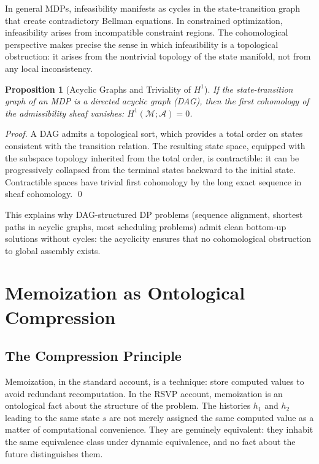 \documentclass[12pt, a4paper, openany]{book}
\theoremstyle{plain}
\newtheorem{proposition}[theorem]{Proposition}
\theoremstyle{definition}
\theoremstyle{remark}
\begin{document}
In general MDPs, infeasibility manifests as cycles in the state-transition graph that create contradictory Bellman equations. In constrained optimization, infeasibility arises from incompatible constraint regions. The cohomological perspective makes precise the sense in which infeasibility is a topological obstruction: it arises from the nontrivial topology of the state manifold, not from any local inconsistency.

\begin{proposition}[Acyclic Graphs and Triviality of $H^1$]
If the state-transition graph of an MDP is a directed acyclic graph (DAG), then the first cohomology of the admissibility sheaf vanishes: $H^1(\mathcal{M}; \mathcal{A}) = 0$.
\end{proposition}

\begin{proof}
A DAG admits a topological sort, which provides a total order on states consistent with the transition relation. The resulting state space, equipped with the subspace topology inherited from the total order, is contractible: it can be progressively collapsed from the terminal states backward to the initial state. Contractible spaces have trivial first cohomology by the long exact sequence in sheaf cohomology. \qed
\end{proof}

This explains why DAG-structured DP problems (sequence alignment, shortest paths in acyclic graphs, most scheduling problems) admit clean bottom-up solutions without cycles: the acyclicity ensures that no cohomological obstruction to global assembly exists.

\chapter{Memoization as Ontological Compression}

\section{The Compression Principle}

Memoization, in the standard account, is a technique: store computed values to avoid redundant recomputation. In the RSVP account, memoization is an ontological fact about the structure of the problem. The histories $h_1$ and $h_2$ leading to the same state $s$ are not merely assigned the same computed value as a matter of computational convenience. They are genuinely equivalent: they inhabit the same equivalence class under dynamic equivalence, and no fact about the future distinguishes them.
\end{document}
